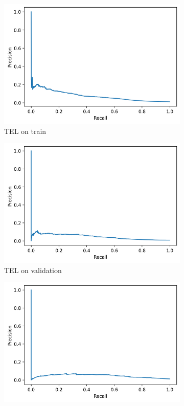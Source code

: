 \documentclass[utf8x]{ctexart}
\begin{document}
\begin{figure}[htb]
  \begin{subfigure}[b]{0.32\textwidth}
    \centering
    \includegraphics[width=\textwidth]{../images/Transformer_train_prc.png}
    \caption{TEL on train}
    \label{fig:Transformer_prc_train}
  \end{subfigure}
  \begin{subfigure}[b]{0.32\textwidth}
    \centering
    \includegraphics[width=\textwidth]{../images/Transformer_val_prc.png}
    \caption{TEL on validation}
    \label{fig:Transformer_prc_val}
  \end{subfigure}
  \begin{subfigure}[b]{0.32\textwidth}
    \centering
    \includegraphics[width=\textwidth]{../images/Transformer_test_prc.png}

\end{subfigure}
\end{figure}
\end{document}
